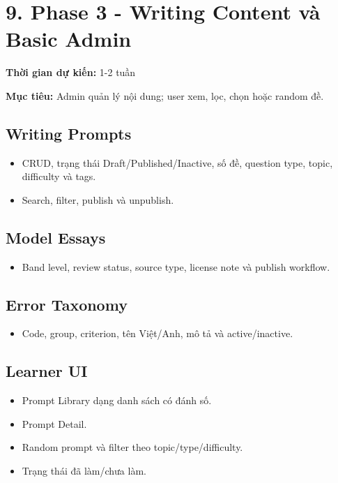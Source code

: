 \documentclass[
  11pt,
  a4paper,
]{article}
\begin{document}
\section{9. Phase 3 - Writing Content và Basic
Admin}\label{phase-3---writing-content-vuxe0-basic-admin}

\textbf{Thời gian dự kiến:} 1-2 tuần

\textbf{Mục tiêu:} Admin quản lý nội dung; user xem, lọc, chọn hoặc
random đề.

\subsection{Writing Prompts}\label{writing-prompts}

\begin{itemize}
\item
  CRUD, trạng thái Draft/Published/Inactive, số đề, question type,
  topic, difficulty và tags.
\item
  Search, filter, publish và unpublish.
\end{itemize}

\subsection{Model Essays}\label{model-essays}

\begin{itemize}
\item
  Band level, review status, source type, license note và publish
  workflow.
\end{itemize}

\subsection{Error Taxonomy}\label{error-taxonomy}

\begin{itemize}
\item
  Code, group, criterion, tên Việt/Anh, mô tả và active/inactive.
\end{itemize}

\subsection{Learner UI}\label{learner-ui}

\begin{itemize}
\item
  Prompt Library dạng danh sách có đánh số.
\item
  Prompt Detail.
\item
  Random prompt và filter theo topic/type/difficulty.
\item
  Trạng thái đã làm/chưa làm.
\end{itemize}
\end{document}
